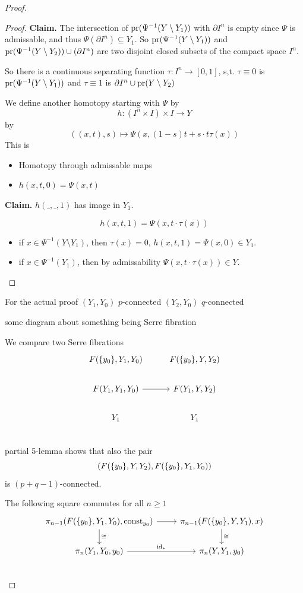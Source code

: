\documentclass[language=english]{TemplateLecture}
\begin{document}
\begin{proof}
\begin{proof}
    \textbf{Claim.} The intersection of \(\operatorname{pr}(\Psi^{-1}(Y\setminus Y_1))\) with \(\partial I^n\) is empty since \(\Psi\) is admissable, and thus \(\Psi(\partial I^n)\subseteq Y_1\). So \(\operatorname{pr}(\Psi^{-1}(Y\setminus Y_1))\) and \(\operatorname{pr}(\Psi^{-1}(Y\setminus Y_2))\cup (\partial I^n)\) are two disjoint closed subsets of the compact space \(I^n\).

    So there is a continuous separating function \(\tau\colon I^n \to [0,1]\), s,t. \(\tau\equiv 0\) is \(\operatorname{pr}(\Psi^{-1}(Y\setminus Y_1))\) and \(\tau\equiv 1\) is \(\partial I^n \cup \operatorname{pr}(Y\setminus Y_2)\)
    
    We define another homotopy starting with \(\Psi\) by
    \[h\colon (I^n\times I)\times I \to Y\]
    by
    \[((x,t),s) \mapsto \Psi(x,(1-s)t + s\cdot t \tau(x))\]
    This is
    \begin{itemize}
        \item Homotopy through admissable maps
        \item \(h(x,t,0) = \Psi(x,t)\)
    \end{itemize}
    \textbf{Claim.} \(h(\_,\_, 1)\) has image in \(Y_1\).

    \[h(x,t,1) = \Psi(x, t\cdot\tau(x))\]
    \begin{itemize}
        \item if \(x \in \Psi^{-1}(Y\setminus Y_1)\), then \(\tau(x) = 0\), \(h(x,t,1) = \Psi(x,0) \in Y_1\).
        \item if \(x \in \Psi^{-1}(Y_1)\), then by admissability \(\Psi(x,t\cdot\tau(x))\in Y\).
    \end{itemize}
\end{proof}

For the actual proof \((Y_1, Y_0)\) \(p\)-connected \((Y_2, Y_0)\) \(q\)-connected

some diagram about something being Serre fibration

We compare two Serre fibrations
\[\begin{tikzcd}
    F(\set{y_0}, Y_1, Y_0) & F(\set{y_0}, Y, Y_2) \\
    F(Y_1, Y_1, Y_0) \ar[r] & F(Y_1, Y, Y_2) \\
    Y_1  & Y_1 \\
\end{tikzcd}\]
partial 5-lemma shows that also the pair
\[(F(\{y_0\}, Y, Y_2), F(\{y_0\}, Y_1, Y_0))\]
is \((p+q-1)\)-connected.

The following square commutes for all \(n \geq 1\)
\[\begin{tikzcd}
    \pi_{n-1}(F(\set{y_0}, Y_1, Y_0), \const_{y_0})\ar[d, "\cong"] \ar[r] & \pi_{n-1}(F(\set{y_0}, Y, Y_1), x) \ar[d, "\cong"]\\
    \pi_n(Y_1, Y_0, y_0) \ar[r, "\id_*"] & \pi_n(Y, Y_1, y_0) \\
\end{tikzcd}\]
\end{proof}
\end{document}
